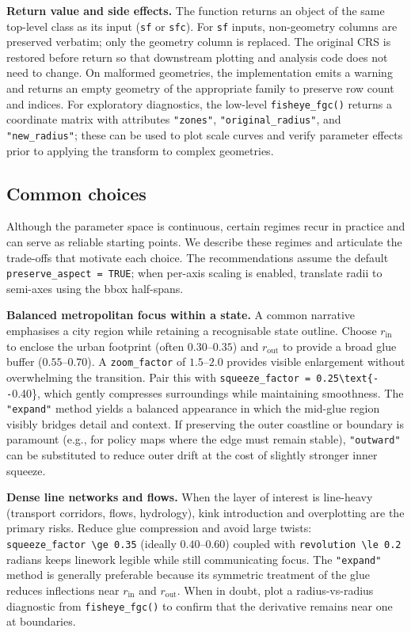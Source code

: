 \textbf{Return value and side effects.} The function returns an object of the same top-level class as
its input (\texttt{sf} or \texttt{sfc}). For \texttt{sf} inputs, non-geometry columns are preserved
verbatim; only the geometry column is replaced. The original CRS is restored before return so that
downstream plotting and analysis code does not need to change. On malformed geometries, the
implementation emits a warning and returns an empty geometry of the appropriate family to preserve
row count and indices. For exploratory diagnostics, the low-level \texttt{fisheye\_fgc()} returns a
coordinate matrix with attributes \texttt{"zones"}, \texttt{"original\_radius"}, and \texttt{"new\_radius"};
these can be used to plot scale curves and verify parameter effects prior to applying the transform
to complex geometries.

\subsection{Common choices}\label{common-choices}

Although the parameter space is continuous, certain regimes recur in practice and can serve as
reliable starting points. We describe these regimes and articulate the trade-offs that motivate each
choice. The recommendations assume the default \texttt{preserve\_aspect\ =\ TRUE}; when per-axis scaling is
enabled, translate radii to semi-axes using the bbox half-spans.

\textbf{Balanced metropolitan focus within a state.} A common narrative emphasises a city region while
retaining a recognisable state outline. Choose \(r_{\text{in}}\) to enclose the urban footprint (often
\(0.30\text{--}0.35\)) and \(r_{\text{out}}\) to provide a broad glue buffer
(\(0.55\text{--}0.70\)). A \texttt{zoom\_factor} of \(1.5\text{--}2.0\) provides visible enlargement
without overwhelming the transition. Pair this with \texttt{squeeze\_factor\ =\ 0.25\textbackslash{}text\{-\/-}0.40\}, which
gently compresses surroundings while maintaining smoothness. The \texttt{"expand"} method yields a
balanced appearance in which the mid-glue region visibly bridges detail and context. If preserving the
outer coastline or boundary is paramount (e.g., for policy maps where the edge must remain stable),
\texttt{"outward"} can be substituted to reduce outer drift at the cost of slightly stronger inner
squeeze.

\textbf{Dense line networks and flows.} When the layer of interest is line-heavy (transport corridors,
flows, hydrology), kink introduction and overplotting are the primary risks. Reduce glue compression
and avoid large twists: \texttt{squeeze\_factor\ \textbackslash{}ge\ 0.35} (ideally \(0.40\text{--}0.60\)) coupled with
\texttt{revolution\ \textbackslash{}le\ 0.2} radians keeps linework legible while still communicating focus. The
\texttt{"expand"} method is generally preferable because its symmetric treatment of the glue reduces
inflections near \(r_{\text{in}}\) and \(r_{\text{out}}\). When in doubt, plot a radius-vs-radius
diagnostic from \texttt{fisheye\_fgc()} to confirm that the derivative remains near one at boundaries.

